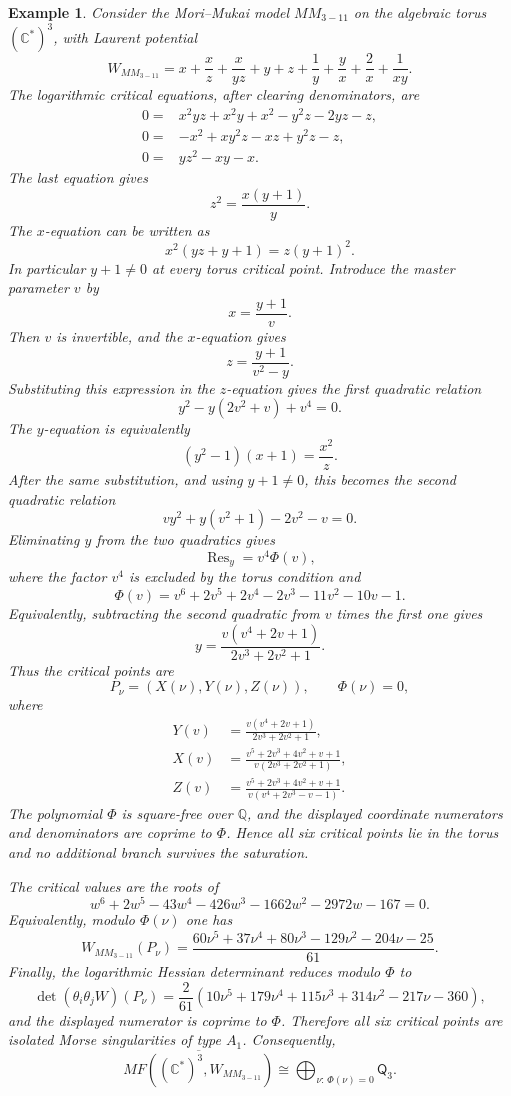 \documentclass[11pt]{amsart}
\newtheorem{example}{Example}[section]
\newcommand{\MorseCat}[1]{\mathsf{Q}_{#1}}
\begin{document}
\begin{example}
Consider the Mori--Mukai model $MM_{3-11}$ on the algebraic torus
$(\mathbb{C}^*)^3$, with Laurent potential
\[
W_{MM_{3-11}}=x+\frac{x}{z}+\frac{x}{yz}+y+z+
\frac{1}{y}+\frac{y}{x}+\frac{2}{x}+\frac{1}{xy}.
\]
The logarithmic critical equations, after clearing denominators, are
\begin{align*}
0={}&x^2yz+x^2y+x^2-y^2z-2yz-z, \\
0={}&-x^2+xy^2z-xz+y^2z-z, \\
0={}&yz^2-xy-x.
\end{align*}
The last equation gives
\[
z^2=\frac{x(y+1)}{y}.
\]
The $x$-equation can be written as
\[
x^2(yz+y+1)=z(y+1)^2.
\]
In particular $y+1\neq0$ at every torus critical point. Introduce the master
parameter $v$ by
\[
x=\frac{y+1}{v}.
\]
Then $v$ is invertible, and the $x$-equation gives
\[
z=\frac{y+1}{v^2-y}.
\]
Substituting this expression in the $z$-equation gives the first quadratic
relation
\[
y^2-y(2v^2+v)+v^4=0.
\]
The $y$-equation is equivalently
\[
(y^2-1)(x+1)=\frac{x^2}{z}.
\]
After the same substitution, and using $y+1\neq0$, this becomes the second
quadratic relation
\[
vy^2+y(v^2+1)-2v^2-v=0.
\]
Eliminating $y$ from the two quadratics gives
\[
\operatorname{Res}_y=v^4\Phi(v),
\]
where the factor $v^4$ is excluded by the torus condition and
\[
\Phi(v)=v^6+2v^5+2v^4-2v^3-11v^2-10v-1.
\]
Equivalently, subtracting the second quadratic from $v$ times the first one
gives
\[
y=\frac{v(v^4+2v+1)}{2v^3+2v^2+1}.
\]
Thus the critical points are
\[
P_\nu=(X(\nu),Y(\nu),Z(\nu)),
\qquad
\Phi(\nu)=0,
\]
where
\begin{align*}
Y(v)&=\frac{v(v^4+2v+1)}{2v^3+2v^2+1}, \\
X(v)&=\frac{v^5+2v^3+4v^2+v+1}{v(2v^3+2v^2+1)}, \\
Z(v)&=\frac{v^5+2v^3+4v^2+v+1}{v(v^4+2v^3-v-1)}.
\end{align*}
The polynomial $\Phi$ is square-free over $\mathbb{Q}$, and the displayed
coordinate numerators and denominators are coprime to $\Phi$. Hence all six
critical points lie in the torus and no additional branch survives the
saturation.

The critical values are the roots of
\[
w^6+2w^5-43w^4-426w^3-1662w^2-2972w-167=0.
\]
Equivalently, modulo $\Phi(\nu)$ one has
\[
W_{MM_{3-11}}(P_\nu)=
\frac{60\nu^5+37\nu^4+80\nu^3-129\nu^2-204\nu-25}{61}.
\]
Finally, the logarithmic Hessian determinant reduces modulo $\Phi$ to
\[
\det(\theta_i\theta_jW)(P_\nu)
=\frac{2}{61}\left(10\nu^5+179\nu^4+115\nu^3
+314\nu^2-217\nu-360\right),
\]
and the displayed numerator is coprime to $\Phi$. Therefore all six critical
points are isolated Morse singularities of type $A_1$. Consequently,
\[
\overline{MF((\mathbb{C}^*)^3,W_{MM_{3-11}})}
\cong \bigoplus_{\nu:\,\Phi(\nu)=0}\MorseCat{3}.
\]
\end{example}
\end{document}
